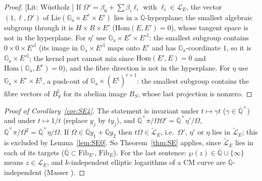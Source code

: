 \documentclass[11pt]{amsart}
\theoremstyle{definition}
\newcommand{\Qb}{\overline{\mathbb{Q}}}
\newcommand{\Ga}{\mathbb{G}_{\mathrm a}}
\newcommand{\Lg}{\mathcal{L}}
\newcommand{\Lt}{\widetilde{\mathcal{L}}}
\newcommand{\Fib}{\mathrm{Fib}}
\newcommand{\lab}[1]{\textup{[#1]}}
\begin{document}
\begin{proof}
\lab{Lit: W\"ustholz \cite{Wu89}} If $\Omega'=\beta_0+\sum\beta_i\ell_i$ with $\ell_i\in\Lg_E$, the vector $(1,\ell,\Omega')$
of $\mathrm{Lie}(\Ga\times E^r\times E')$ lies in a $\Qb$-hyperplane; the smallest algebraic subgroup through it is
$H\times B\times E'$ ($\mathrm{Hom}(E,E')=0$), whose tangent space is not in the hyperplane. For $\eta'$ use
$\Ga\times E^r\times E'^\natural$: the smallest subgroup contains $0\times0\times E'^\natural$ (its image in
$\Ga\times E'^\natural$ maps onto $E'$ and has $\Ga$-coordinate $1$, so it is $\Ga\times E'^\natural$; the kernel part
cannot mix since $\mathrm{Hom}(E',E)=0$ and $\mathrm{Hom}(\Ga,E^r)=0$), and the fibre direction is not in the hyperplane.
For $\eta$ use $\Ga\times E^r\times E^\natural$, a push-out of $\Ga\times(E^\natural)^{r+1}$: the smallest subgroup
contains the fibre vectors of $B_S^\natural$ for its abelian image $B_S$, whose last projection is nonzero.
\end{proof}

\begin{proof}[Proof of Corollary~\ref{cor:SE4}]
The statement is invariant under $t\mapsto\gamma t$ ($\gamma\in\Qb^\times$) and under $t\mapsto1/t$ (replace $y_j$ by
$ty_j$), and $\Qb^\times\pi/\Omega\Omega'=\Qb^\times\eta'/\Omega$, $\Qb^\times\pi/\Omega^2=\Qb^\times\eta/\Omega$. If
$\Omega\in\Qb y_1+\Qb y_2$ then $t\Omega\in\Lt_E$, i.e.\ $\Omega'$, $\eta'$ or $\eta$ lies in $\Lt_E$; this is excluded by
Lemma~\ref{lem:SE0}. So Theorem~\ref{thm:SE} applies, since $\Lt_E$ lies in each of its targets ($\Qb\subset\Fib_{E'}$,
$\Fib_E$). For the last sentence: $\wp(z)\in\Qb\cup\{\infty\}$ means $z\in\Lg_E$, and $k$-independent elliptic logarithms of
a CM curve are $\Qb$-independent (Masser \cite{Ma75}).
\end{proof}
\end{document}
